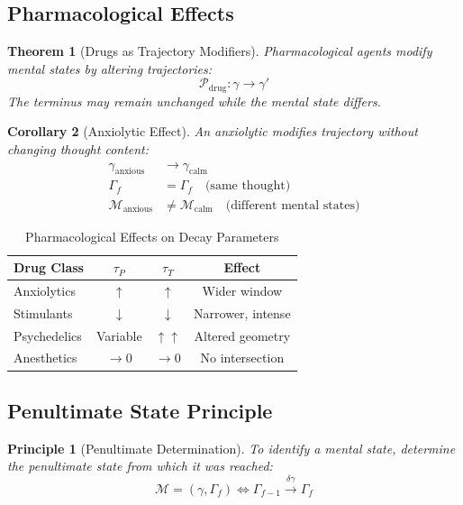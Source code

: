 \documentclass[twocolumn,amsmath,amssymb,aps,prl,superscriptaddress]{revtex4-2}
\newtheorem{theorem}{Theorem}[section]
\newtheorem{corollary}[theorem]{Corollary}
\newtheorem{principle}{Principle}
\newcommand{\Mstate}{\mathcal{M}}
\newcommand{\Gstate}{\Gamma}
\newcommand{\traj}{\gamma}
\begin{document}
\subsection{Pharmacological Effects}

\begin{theorem}[Drugs as Trajectory Modifiers]
\label{thm:drugs}
Pharmacological agents modify mental states by altering trajectories:
\begin{equation}
\mathcal{P}_{\text{drug}}: \traj \to \traj'
\end{equation}
The terminus may remain unchanged while the mental state differs.
\end{theorem}

\begin{corollary}[Anxiolytic Effect]
An anxiolytic modifies trajectory without changing thought content:
\begin{align}
\traj_{\text{anxious}} &\to \traj_{\text{calm}} \\
\Gstate_f &= \Gstate_f \quad \text{(same thought)} \\
\Mstate_{\text{anxious}} &\neq \Mstate_{\text{calm}} \quad \text{(different mental states)}
\end{align}
\end{corollary}

\begin{table}[h]
\centering
\caption{Pharmacological Effects on Decay Parameters}
\begin{tabular}{lccc}
\toprule
Drug Class & $\tau_P$ & $\tau_T$ & Effect \\
\midrule
Anxiolytics & $\uparrow$ & $\uparrow$ & Wider window \\
Stimulants & $\downarrow$ & $\downarrow$ & Narrower, intense \\
Psychedelics & Variable & $\uparrow\uparrow$ & Altered geometry \\
Anesthetics & $\to 0$ & $\to 0$ & No intersection \\
\bottomrule
\end{tabular}
\end{table}

\subsection{Penultimate State Principle}

\begin{principle}[Penultimate Determination]
To identify a mental state, determine the penultimate state from which it was reached:
\begin{equation}
\Mstate = (\traj, \Gstate_f) \iff \Gstate_{f-1} \xrightarrow{\delta\traj} \Gstate_f
\end{equation}
\end{principle}
\end{document}
